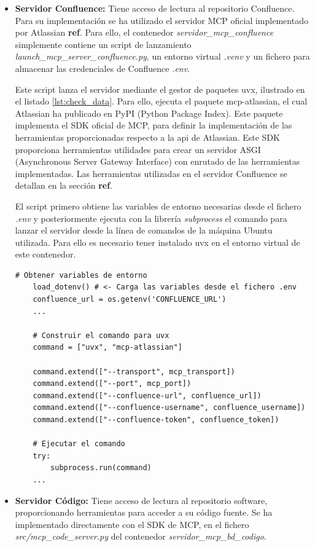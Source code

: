 \begin{itemize}
  \item\textbf{Servidor Confluence: }Tiene acceso de lectura al repositorio Confluence. Para su implementación se ha utilizado el servidor MCP oficial implementado por Atlassian \textbf{ref}. Para ello, el contenedor \textit{servidor\_mcp\_confluence} simplemente contiene un script de lanzamiento \textit{launch\_mcp\_server\_confluence.py}, un entorno virtual \textit{.venv} y un fichero para almacenar las credenciales de Confluence \textit{.env}. 

    Este script lanza el servidor mediante el gestor de paquetes uvx, ilustrado en el listado \ref{lst:check_data}. Para ello, ejecuta el paquete mcp-atlassian, el cual Atlassian ha publicado en PyPI (Python Package Index). Este paquete implementa el SDK oficial de MCP, para definir la implementación de las herramientas proporcionadas respecto a la api de Atlassian. Este SDK proporciona herramientas utilidades para crear un servidor ASGI (Asynchronous Server Gateway Interface) con enrutado de las herramientas implementadas. Las herramientas utilizadas en el servidor Confluence se detallan en la sección \textbf{ref}.  

El script primero obtiene las variables de entorno necesarias desde el fichero \textit{.env} y posteriormente ejecuta con la librería \textit{subprocess} el comando para lanzar el servidor desde la línea de comandos de la máquina Ubuntu utilizada. Para ello es necesario tener instalado uvx en el entorno virtual de este contenedor.
\begin{lstlisting}[caption={Ejecución del lanzamiento de servidor MCP Confluence con uvx},label={lst:check_data}]
    # Obtener variables de entorno
    load_dotenv() # <- Carga las variables desde el fichero .env
    confluence_url = os.getenv('CONFLUENCE_URL')
    ...

    # Construir el comando para uvx
    command = ["uvx", "mcp-atlassian"]
    
    command.extend(["--transport", mcp_transport])
    command.extend(["--port", mcp_port]) 
    command.extend(["--confluence-url", confluence_url])
    command.extend(["--confluence-username", confluence_username])
    command.extend(["--confluence-token", confluence_token])

    # Ejecutar el comando
    try:
        subprocess.run(command)
    ...
\end{lstlisting}

\item\textbf{Servidor Código: }Tiene acceso de lectura al repositorio software, proporcionando herramientas para acceder a su código fuente. Se ha implementado directamente con el SDK de MCP, en el fichero \textit{src/mcp\_code\_server.py} del contenedor \textit{servidor\_mcp\_bd\_codigo}. 


\end{itemize}
